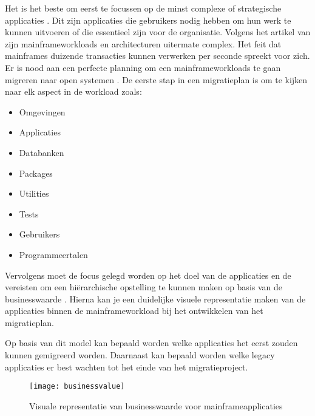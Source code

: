 Het is het beste om eerst te focussen op de minst complexe of strategische applicaties \autocite{Korzenlowski2017}. Dit zijn applicaties die gebruikers nodig hebben om hun werk te kunnen uitvoeren of die essentieel zijn voor de organisatie. Volgens het artikel van \textcite{Marble2017} zijn mainframeworkloads en architecturen uitermate complex. Het feit dat mainframes duizende transacties kunnen verwerken per seconde spreekt voor zich. Er is nood aan een perfecte planning om een mainframeworkloads te gaan migreren naar open systemen \autocite{Marble2017}. De eerste stap in een migratieplan is om te kijken naar elk aspect in de workload zoals: 
    \begin{itemize}
        \item Omgevingen
        \item Applicaties
        \item Databanken
        \item Packages
        \item Utilities
        \item Tests
        \item Gebruikers
        \item Programmeertalen
    \end{itemize}
Vervolgens moet de focus gelegd worden op het doel van de applicaties en de vereisten om een hiërarchische opstelling te kunnen maken op basis van de businesswaarde \autocite{Marble2017}. Hierna kan je een duidelijke visuele representatie maken van de applicaties binnen de mainframeworkload bij het ontwikkelen van het migratieplan. 

Op basis van dit model kan bepaald worden welke applicaties het eerst zouden kunnen gemigreerd worden. Daarnaast kan bepaald worden welke legacy applicaties er best wachten tot het einde van het migratieproject. 

\begin{figure}
\texttt{[image: businessvalue]}
\caption{Visuale representatie van businesswaarde voor mainframeapplicaties \autocite{Marble2017}}
\end{figure}



\subsection{}
\label{sec:Workloads migreren naar de cloud}

